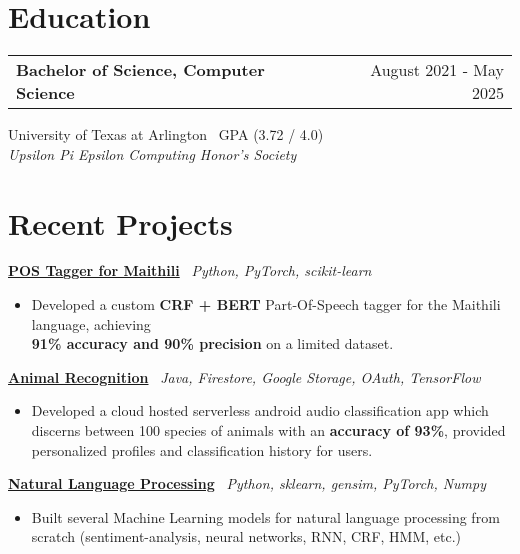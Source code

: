 \documentclass[a4paper,12pt]{article}
\begin{document}
\vspace{-0.7em}
\section{Education}
\noindent
\begin{tabularx}{\linewidth}{@{}Xr@{}}
\textbf{Bachelor of Science, Computer Science} & August 2021 - May 2025 \\
\end{tabularx}
\vspace{0.2em}
University of Texas at Arlington \ GPA (3.72 / 4.0) \\
\textit{Upsilon Pi Epsilon Computing Honor's Society}

\vspace{-0.7em}
\section{Recent Projects}

\href{https://github.com/kilibarda4/pos-tagger-Maithili}{\textbf{POS Tagger for Maithili}} \ \textit{Python, PyTorch, scikit-learn}
\begin{itemize}[leftmargin=*, nosep]
\vspace{-0.4em}
    \item Developed a custom \textbf{CRF + BERT} Part-Of-Speech tagger for the Maithili language, achieving \\ \textbf{91\% accuracy and 90\% precision} on a limited dataset.
\end{itemize}

\vspace{-0.4em}
\href{https://github.com/kilibarda4/animal-recognition-android}{\textbf{Animal Recognition}} \ \textit{Java, Firestore, Google Storage, OAuth, TensorFlow}
\begin{itemize}[leftmargin=*, nosep]
\vspace{-0.4em}
    \item Developed a cloud hosted serverless android audio classification app which discerns between 100 species of animals with an \textbf{accuracy of 93\%}, provided personalized profiles and classification history for users.
\end{itemize}

\vspace{-0.4em}
\href{https://github.com/kilibarda4/natural-language-processing}{\textbf{Natural Language Processing}} \ \textit{Python, sklearn, gensim, PyTorch, Numpy}
\begin{itemize}[leftmargin=*, nosep]
\vspace{-0.4em}
    \item Built several Machine Learning models for natural language processing from scratch (sentiment-analysis, neural networks, RNN, CRF, HMM, etc.)
\end{itemize}

\vfill
\end{document}
